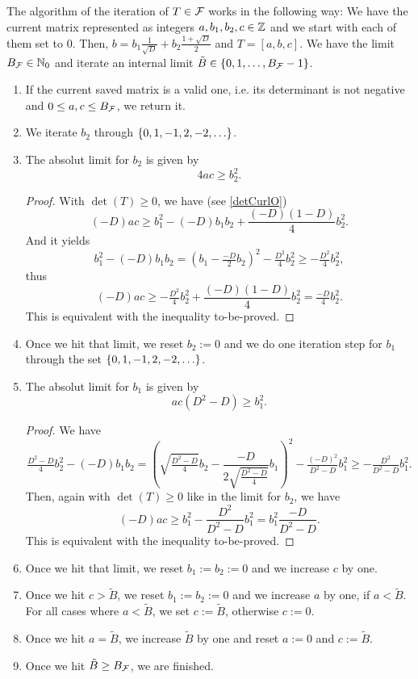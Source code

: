 The algorithm of the iteration of $T \in \mathcal{F}$ works in the following way: We have the current matrix represented as integers $a,b_1,b_2,c \in \mathbb{Z}$ and we start with each of them set to $0$. Then, $b = b_1 \frac{1}{\sqrt{D}} + b_2 \frac{1 + \sqrt{D}} {2}$ and $T = [a,b,c]$. We have the limit $B_{\mathcal{F}} \in \mathbb{N}_0$ and iterate an internal limit $\tilde{B} \in \Set{0,1,\dots,B_\F-1}$.
\begin{enumerate}
\item If the current saved matrix is a valid one, i.e. its determinant is not negative and $0 \le a,c \le B_{\mathcal{F}}$, we return it.
\item We iterate $b_2$ through $\Set{0,1,-1,2,-2,\dots}$.
\item
The absolut limit for $b_2$ is given by
\[ 4 a c \ge b_2^2 . \]
\begin{proof}
With $\det(T) \ge 0$, we have (see \cref{detCurlO})
\[ (-D) a c \ge b_1^2 - (-D) b_1 b_2 + \frac{(-D)(1-D)}{4} b_2^2 . \]
And it yields
\[ b_1^2 - (-D) b_1 b_2 = (b_1 - \tfrac{-D}{2} b_2)^2 - \tfrac{D^2}{4} b_2^2 \ge - \tfrac{D^2}{4} b_2^2 , \]
thus
\[ (-D) a c \ge - \tfrac{D^2}{4} b_2^2 + \frac{(-D)(1-D)}{4} b_2^2 = \tfrac{-D}{4} b_2^2 . \]
This is equivalent with the inequality to-be-proved.
\end{proof}
\item Once we hit that limit, we reset $b_2 := 0$ and we do one iteration step for $b_1$ through the set $\Set{0,1,-1,2,-2,\dots}$.
\item
The absolut limit for $b_1$ is given by
\[ a c (D^2 - D) \ge b_1^2 . \]
\begin{proof}
We have
\[ \tfrac{D^2-D}{4} b_2^2 - (-D) b_1 b_2
= \left( \sqrt{\tfrac{D^2-D}{4}} b_2 - \frac{-D}{2 \sqrt{\tfrac{D^2-D}{4}}} b_1 \right)^2
- \tfrac{(-D)^2}{D^2 - D} b_1^2
\ge - \tfrac{D^2}{D^2 - D} b_1^2 .
\]
Then, again with $\det(T) \ge 0$ like in the limit for $b_2$, we have
\[ (-D) a c \ge b_1^2 - \frac{D^2}{D^2 - D} b_1^2 = b_1^2 \frac{-D}{D^2-D} . \]
This is equivalent with the inequality to-be-proved.
\end{proof}
\item Once we hit that limit, we reset $b_1 := b_2 := 0$ and we increase $c$ by one.
\item Once we hit $c > \tilde{B}$, we reset $b_1 := b_2 := 0$ and we increase $a$ by one, if $a < \tilde{B}$. For all cases where $a < \tilde{B}$, we set $c := \tilde{B}$, otherwise $c := 0$.
\item Once we hit $a = \tilde{B}$, we increase $\tilde{B}$ by one and reset $a := 0$ and $c := \tilde{B}$.
\item Once we hit $\tilde{B} \ge B_{\mathcal{F}}$, we are finished.
\end{enumerate}

